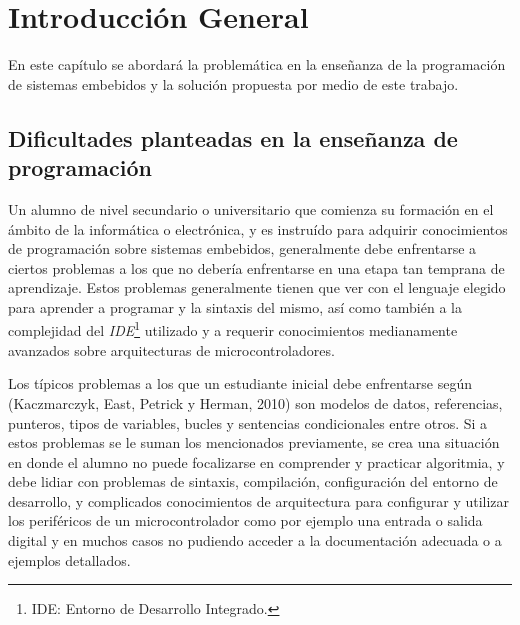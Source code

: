 
\chapter{Introducción General} %

\label{Chapter1} %
\label{IntroGeneral}


\newcommand{\keyword}[1]{\textbf{#1}}
\newcommand{\tabhead}[1]{\textbf{#1}}
\newcommand{\code}[1]{\texttt{#1}}
\newcommand{\file}[1]{\texttt{\bfseries#1}}
\newcommand{\option}[1]{\texttt{\itshape#1}}
\newcommand{\grados}{$^{\circ}$}


En este capítulo se abordará la problemática en la enseñanza de la programación de sistemas embebidos y la solución propuesta por medio de este trabajo.

\section{Dificultades planteadas en la enseñanza de programación}

Un alumno de nivel secundario o universitario que comienza su formación en el ámbito de la informática o electrónica, y es instruído para adquirir conocimientos de programación sobre sistemas embebidos, generalmente debe enfrentarse a ciertos problemas a los que no debería enfrentarse en una etapa tan temprana de aprendizaje. Estos problemas generalmente tienen que ver con el lenguaje elegido para aprender a programar y la sintaxis del mismo, así como también a la complejidad del \textit{IDE}\footnote{IDE: Entorno de Desarrollo Integrado.} utilizado y a requerir conocimientos medianamente avanzados sobre arquitecturas de microcontroladores. 

Los típicos problemas a los que un estudiante inicial debe enfrentarse según (Kaczmarczyk, East, Petrick y Herman, 2010) \cite{papereducacion2} son modelos de datos, referencias, punteros, tipos de variables, bucles y sentencias condicionales entre otros. Si a estos problemas se le suman los mencionados previamente, se crea una situación en donde el alumno no puede focalizarse en comprender y practicar algoritmia, y debe lidiar con problemas de sintaxis, compilación, configuración del entorno de desarrollo, y complicados conocimientos de arquitectura para configurar y utilizar los periféricos de un microcontrolador como por ejemplo una entrada o salida digital y en muchos casos no pudiendo acceder a la documentación adecuada o a ejemplos detallados. 

